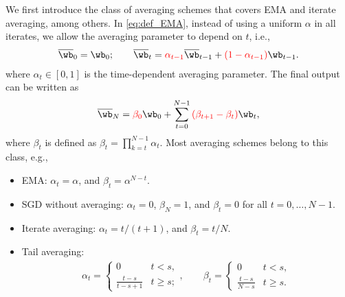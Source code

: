 \documentclass[11pt]{article}
\newcommand{\owb}{\overline{\wb}}
\begin{document}
We first introduce the class of averaging schemes that covers EMA and iterate averaging, among others. In \eqref{eq:def_EMA}, instead of using a uniform $\alpha$ in all iterates, we allow the averaging parameter to depend on $t$, i.e.,
\begin{align*}
\owb_0=\wb_0;\qquad\owb_t=\textcolor{red}{\alpha_{t-1}}\owb_{t-1}+\textcolor{red}{(1-\alpha_{t-1})}\wb_{t-1}.
\end{align*}
where $\alpha_t\in[0, 1]$ is the time-dependent averaging parameter. The final output can be written as
\begin{align*}
\owb_N=\textcolor{red}{\beta_0}\wb_0+\sum_{t=0}^{N-1}\textcolor{red}{(\beta_{t+1}-\beta_t)}\wb_t,
\end{align*}
where $\beta_t$ is defined as $\beta_t=\prod_{k=t}^{N-1}\alpha_t$. Most averaging schemes belong to this class, e.g.,
\begin{shaded}
\begin{itemize}[leftmargin=*]
\item EMA: $\alpha_t=\alpha$, and $\beta_t=\alpha^{N-t}$.
\item SGD without averaging: $\alpha_t=0$, $\beta_N=1$, and $\beta_t=0$ for all $t=0, \dots, N-1$.
\item Iterate averaging: $\alpha_t=t/(t+1)$, and $\beta_t=t/N$.
\item Tail averaging:
\begin{align*}
\alpha_t=\begin{cases}
0 & t<s,\\
\frac{t-s}{t-s+1} & t\ge s;
\end{cases},\qquad\beta_t=\begin{cases}
0 & t<s,\\
\frac{t-s}{N-s} & t\ge s.
\end{cases}
\end{align*}
\end{itemize}
\end{shaded}
\end{document}
